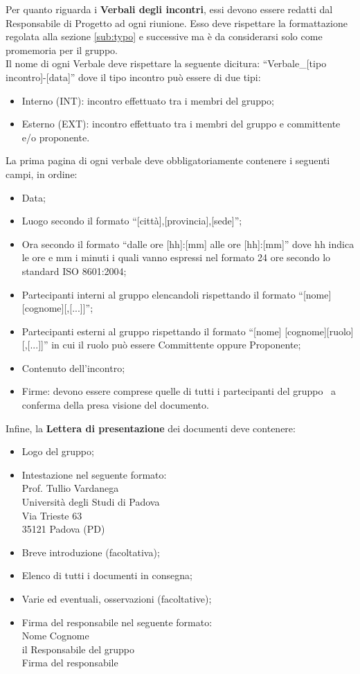 {{\begin{itemize}
		\end{itemize}
		Per quanto riguarda i \textbf{Verbali degli incontri}, essi devono essere redatti dal Responsabile di Progetto ad ogni riunione. Esso deve rispettare la formattazione regolata alla sezione \ref{sub:typo} e successive ma \`{e} da considerarsi solo come promemoria per il gruppo.\\
		Il nome di ogni Verbale deve rispettare la seguente dicitura: “Verbale\_[tipo incontro]-[data]” dove il tipo incontro pu\`{o} essere di due tipi:
		\begin{itemize}
			\item Interno (INT): incontro effettuato tra i membri del gruppo;
			\item Esterno (EXT): incontro effettuato tra i membri del gruppo e committente e/o proponente.
		\end{itemize}
		La prima pagina di ogni verbale deve obbligatoriamente contenere i seguenti campi, in ordine:
		\begin{itemize}
			\item Data;
			\item Luogo secondo il formato “[citt\`{a}],[provincia],[sede]”;
			\item Ora secondo il formato “dalle ore [hh]:[mm] alle ore [hh]:[mm]” dove hh indica le ore e mm i minuti i quali vanno espressi nel formato 24 ore secondo lo standard ISO 8601:2004;
			\item Partecipanti interni al gruppo elencandoli rispettando il formato “[nome] [cognome][,[...]]”;
			\item Partecipanti esterni al gruppo rispettando il formato “[nome] [cognome][ruolo][,[...]]” in cui il ruolo pu\`{o} essere Committente oppure Proponente;
			\item Contenuto dell'incontro;
			\item Firme: devono essere comprese quelle di tutti i partecipanti del gruppo \gruppo\ a conferma della presa visione del documento.
		\end{itemize}
		Infine, la \textbf{Lettera di presentazione} dei documenti deve contenere:
		\begin{itemize}
			\item Logo del gruppo;
			\item Intestazione nel seguente formato:\\
					Prof. Tullio Vardanega\\
					Università degli Studi di Padova\\
					Via Trieste 63\\
					35121 Padova (PD)
			\item Breve introduzione (facoltativa);
			\item Elenco di tutti i documenti in consegna;
			\item Varie ed eventuali, osservazioni (facoltative);
			\item Firma del responsabile nel seguente formato:\\
					{Nome} {Cognome}\\
					il Responsabile del gruppo \gruppo \\
					{Firma del responsabile}
		\end{itemize}		
	}
}
